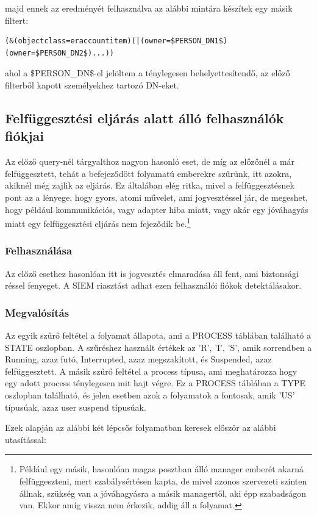 		majd ennek az eredményét felhasználva az alábbi mintára készítek egy másik filtert:
		\begin{lstlisting}
(&(objectclass=eraccountitem)(|(owner=$PERSON_DN1$)(owner=$PERSON_DN2$)...))\end{lstlisting} \label{code:accownerfilter}
		ahol a \$PERSON\_DN\$-el jelöltem a ténylegesen behelyettesítendő, az előző filterből kapott személyekhez tartozó DN-eket.
		
\subsection{Felfüggesztési eljárás alatt álló felhasználók fiókjai}
Az előző query-nél tárgyalthoz nagyon hasonló eset, de míg az előzőnél a már felfüggesztett, tehát a befejeződött folyamatú emberekre szűrünk, itt azokra, akiknél még zajlik az eljárás. Ez általában elég ritka, mivel a felfüggesztésnek pont az a lényege, hogy gyors, atomi művelet, ami jogvesztéssel jár, de megeshet, hogy például kommunikációs, vagy adapter hiba miatt, vagy akár egy jóváhagyás miatt egy felfüggesztési eljárás nem fejeződik be.\footnote{Például egy másik, hasonlóan magas posztban álló manager emberét akarná felfüggeszteni, mert szabálysértésen kapta, de mivel azonos szervezeti szinten állnak, szükség van a jóváhagyásra a másik managertől, aki épp szabadságon van. Ekkor amíg vissza nem érkezik, addig áll a folyamat.}
	\subsubsection{Felhasználása}
		Az előző esethez hasonlóan itt is jogvesztés elmaradása áll fent, ami biztonsági réssel fenyeget. A SIEM riasztást adhat ezen felhasználói fiókok detektálásakor. 
	\subsubsection{Megvalósítás}
		Az egyik szűrő feltétel a folyamat állapota, ami a PROCESS táblában található a STATE oszlopban. A szűréshez használt értékek az 'R', 'I', 'S', amik sorrendben a Running, azaz futó, Interrupted, azaz megszakított, és Suspended, azaz felfüggesztett. A másik szűrő feltétel a process típusa, ami meghatározza hogy egy adott process ténylegesen mit hajt végre. Ez a PROCESS táblában a TYPE oszlopban található, és jelen esetben azok a folyamatok a fontosak, amik 'US' típusúak, azaz user suspend típusúak.
		
		Ezek alapján az alábbi két lépcsős folyamatban keresek először az alábbi utasítással:
		

